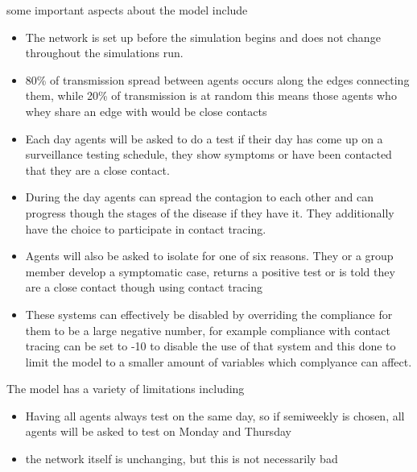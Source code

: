 \documentclass{article}
\begin{document}
some important aspects about the model include
\begin{itemize}

\item The network is set up before the simulation begins and does not change throughout the simulations run. 

\item 80\% of transmission spread between agents occurs along the edges connecting them, while 20\% of transmission is at  random this means those agents who whey share an edge with would be close contacts

\item Each day agents will be asked to do a test if their day has come up on a surveillance testing schedule, they show symptoms or have been contacted that they are a close contact.

\item During the day agents can spread the contagion to each other and can progress though the stages of the disease if they have it. They additionally have the choice to participate in contact tracing.

\item Agents will also be asked to isolate for one of six reasons. They or a group member develop a symptomatic case, returns a positive test or is told they are a close contact though using contact tracing

\item These systems can effectively be disabled by overriding the compliance for them to be a large negative number, for example compliance with contact tracing can be set to -10 to disable the use of that system and this done to limit the model to a smaller amount of variables which complyance can affect.
\end{itemize}


The model has a variety of limitations including 
\begin{itemize}
\item Having all agents always test on the same day, so if semiweekly is chosen, all agents will be asked to test on Monday and Thursday
\item the network itself is unchanging, but this is not necessarily bad
\end{itemize}

\newpage
\end{document}
